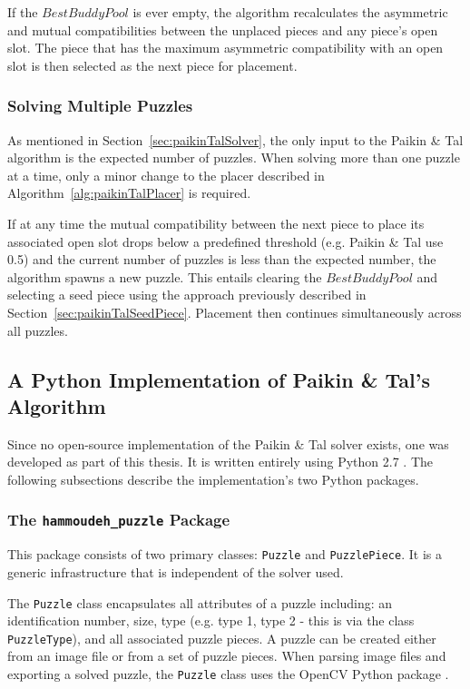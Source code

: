 \documentclass{report}
\newcommand{\hammoudehPuzzlePackage}{\texttt{hammoudeh\_puzzle} }
\begin{document}
If the $BestBuddyPool$ is ever empty, the algorithm recalculates the asymmetric and mutual compatibilities between the unplaced pieces and any piece's open slot.  The piece that has the maximum asymmetric compatibility with an open slot is then selected as the next piece for placement.

\subsubsection{Solving Multiple Puzzles}\label{sec:paikinTalSolvingMultiplePuzzles}

As mentioned in Section~\ref{sec:paikinTalSolver}, the only input to the Paikin \& Tal algorithm is the expected number of puzzles.   When solving more than one puzzle at a time, only a minor change to the placer described in Algorithm~\ref{alg:paikinTalPlacer} is required.

If at any time the mutual compatibility between the next piece to place its associated open slot drops below a predefined threshold (e.g. Paikin \& Tal use 0.5) and the current number of puzzles is less than the expected number, the algorithm spawns a new puzzle.  This entails clearing the $BestBuddyPool$ and selecting a seed piece using the approach previously described in Section~\ref{sec:paikinTalSeedPiece}.   Placement then continues simultaneously across all puzzles.


\subsection{A Python Implementation of Paikin \& Tal's Algorithm}\label{sec:pythonPaikinTalAlgorithm}

Since no open-source implementation of the Paikin \& Tal solver exists, one was developed as part of this thesis.  It is written entirely using Python 2.7 \cite{python}.  The following subsections describe the implementation's two  Python packages.  

\subsubsection{The \hammoudehPuzzlePackage Package}\label{sec:hammoudehPuzzlePackage}

This package consists of two primary classes: \texttt{Puzzle} and \texttt{PuzzlePiece}.  It is a generic infrastructure that is independent of the solver used.  

The \texttt{Puzzle} class encapsulates all attributes of a puzzle including: an identification number, size, type (e.g. type 1, type 2 - this is via the class \texttt{PuzzleType}), and all associated puzzle pieces.  A puzzle can be created either from an image file or from a set of puzzle pieces.   When parsing image files and exporting a solved puzzle, the \texttt{Puzzle} class uses the OpenCV Python package \cite{opencv_library}. 
\end{document}
